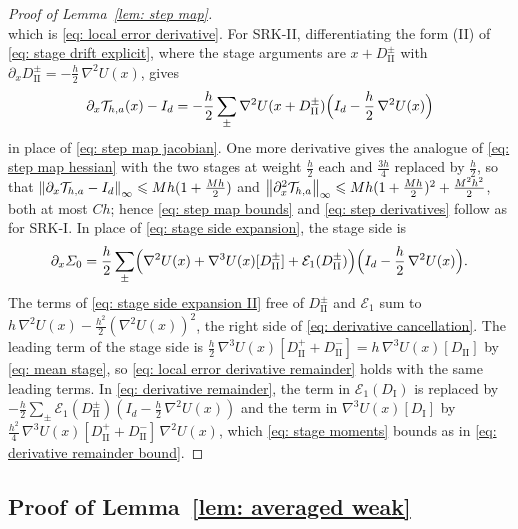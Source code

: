 \documentclass[namedate,webpdf,imanum]{ima-authoring-template}
\newcommand{\Le}{\leqslant}
\theoremstyle{thmstyletwo}
\numberwithin{equation}{section}
\begin{document}
\begin{proof}[Proof of Lemma~\ref{lem: step map}]
\begin{equation*}
    \end{equation*}
    which is \eqref{eq: local error derivative}. For SRK-II, differentiating the form (II) of \eqref{eq: stage drift explicit}, where the stage arguments are $x + D_{\mathrm{II}}^{\pm}$ with $\partial_x D_{\mathrm{II}}^{\pm} = - \frac h2\, \nabla^2 U(x)$, gives
    \begin{equation*}
        \partial_x \mathcal T_{h,a}(x) - I_d = - \frac h2 \sum_{\pm} \nabla^2 U(x + D_{\mathrm{II}}^{\pm}) \Bigl( I_d - \frac h2\, \nabla^2 U(x) \Bigr)
    \end{equation*}
    in place of \eqref{eq: step map jacobian}. One more derivative gives the analogue of \eqref{eq: step map hessian} with the two stages at weight $\frac h2$ each and $\frac{3h}{4}$ replaced by $\frac h2$, so that $\norm{\partial_x \mathcal T_{h,a} - I_d}_\infty \Le M h ( 1 + \frac{Mh}{2} )$ and $\norm{\partial_x^2 \mathcal T_{h,a}}_\infty \Le M h ( 1 + \frac{Mh}{2} )^2 + \frac{M^2 h^2}{2}$, both at most $C h$; hence \eqref{eq: step map bounds} and \eqref{eq: step derivatives} follow as for SRK-I. In place of \eqref{eq: stage side expansion}, the stage side is
    \begin{equation}
        \partial_x \Sigma_0 = \frac h2 \sum_{\pm} \Bigl( \nabla^2 U(x) + \nabla^3 U(x)[D_{\mathrm{II}}^{\pm}] + \mathcal E_1(D_{\mathrm{II}}^{\pm}) \Bigr) \Bigl( I_d - \frac h2\, \nabla^2 U(x) \Bigr) .
        \label{eq: stage side expansion II}
    \end{equation}
    The terms of \eqref{eq: stage side expansion II} free of $D_{\mathrm{II}}^{\pm}$ and $\mathcal E_1$ sum to $h\, \nabla^2 U(x) - \frac{h^2}{2} ( \nabla^2 U(x) )^2$, the right side of \eqref{eq: derivative cancellation}. The leading term of the stage side is $\frac h2\, \nabla^3 U(x)[D_{\mathrm{II}}^{+} + D_{\mathrm{II}}^{-}] = h\, \nabla^3 U(x)[D_{\mathrm{II}}]$ by \eqref{eq: mean stage}, so \eqref{eq: local error derivative remainder} holds with the same leading terms. In \eqref{eq: derivative remainder}, the term in $\mathcal E_1(D_{\mathrm I})$ is replaced by $- \frac h2 \sum_{\pm} \mathcal E_1(D_{\mathrm{II}}^{\pm}) ( I_d - \frac h2\, \nabla^2 U(x) )$ and the term in $\nabla^3 U(x)[D_{\mathrm I}]$ by $\frac{h^2}{4}\, \nabla^3 U(x)[D_{\mathrm{II}}^{+} + D_{\mathrm{II}}^{-}]\, \nabla^2 U(x)$, which \eqref{eq: stage moments} bounds as in \eqref{eq: derivative remainder bound}.
\end{proof}

\subsection{Proof of Lemma~\ref{lem: averaged weak}}
\label{sec: averaged weak proof}
\end{document}

